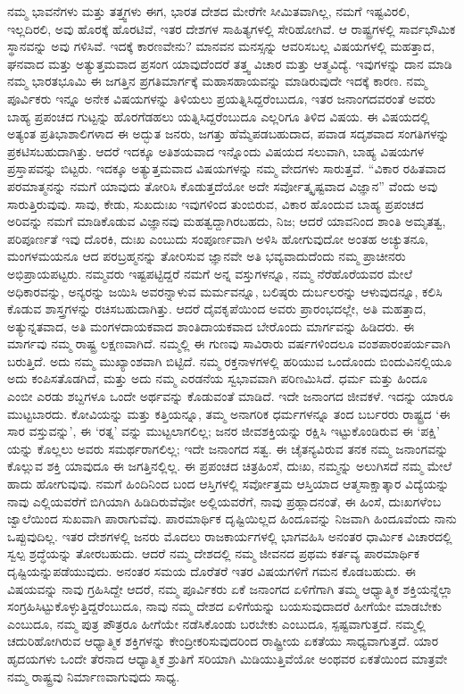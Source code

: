 ನಮ್ಮ ಭಾವನೆಗಳು ಮತ್ತು ತತ್ತ್ವಗಳು ಈಗ, ಭಾರತ ದೇಶದ ಮೇರೆಗೇ ಸೀಮಿತವಾಗಿಲ್ಲ, ನಮಗೆ ಇಷ್ಟವಿರಲಿ, ಇಲ್ಲದಿರಲಿ, ಅವು ಹೊರಕ್ಕೆ ಹೊರಟಿವೆ, ಇತರ ದೇಶಗಳ ಸಾಹಿತ್ಯಗಳಲ್ಲಿ ಸೇರಿಹೋಗಿವೆ. ಆ ರಾಷ್ಟ್ರಗಳಲ್ಲಿ ಸಾರ್ವಭೌಮಿಕ ಸ್ಥಾನವನ್ನು ಅವು ಗಳಿಸಿವೆ. ಇದಕ್ಕೆ ಕಾರಣವೇನು? ಮಾನವನ ಮನಸ್ಸನ್ನು ಆವರಿಸಬಲ್ಲ ವಿಷಯಗಳಲ್ಲಿ ಮಹತ್ತಾದ, ಘನವಾದ ಮತ್ತು ಅತ್ಯುತ್ತಮವಾದ ಪ್ರಸಂಗ ಯಾವುದೆಂದರೆ ತತ್ತ್ವ ವಿಚಾರ ಮತ್ತು ಆತ್ಮವಿದ್ಯೆ. ಇವುಗಳನ್ನು ದಾನ ಮಾಡಿ ನಮ್ಮ ಭಾರತಭೂಮಿ ಈ ಜಗತ್ತಿನ ಪ್ರಗತಿಮಾರ್ಗಕ್ಕೆ ಮಹಾಸಹಾಯವನ್ನು ಮಾಡಿರುವುದೇ ಇದಕ್ಕೆ ಕಾರಣ. ನಮ್ಮ ಪೂರ್ವಿಕರು ಇನ್ನೂ ಅನೇಕ ವಿಷಯಗಳನ್ನು ತಿಳಿಯಲು ಪ್ರಯತ್ನಿಸಿದ್ದರೆಂಬುದೂ, ಇತರ ಜನಾಂಗದವರಂತೆ ಅವರು ಬಾಹ್ಯ ಪ್ರಪಂಚದ ಗುಟ್ಟನ್ನು ಹೊರಗೆಡಹಲು ಯತ್ನಿಸಿದ್ದರೆಂಬುದೂ ಎಲ್ಲರಿಗೂ ತಿಳಿದ ವಿಷಯ. ಈ ವಿಷಯದಲ್ಲಿ ಅತ್ಯಂತ ಪ್ರತಿಭಾಶಾಲಿಗಳಾದ ಈ ಅದ್ಭುತ ಜನರು, ಜಗತ್ತು ಹೆಮ್ಮೆಪಡಬಹುದಾದ, ಪವಾಡ ಸದೃಶವಾದ ಸಂಗತಿಗಳನ್ನು ಪ್ರಕಟಿಸಬಹುದಾಗಿತ್ತು. ಆದರೆ ಇದಕ್ಕೂ ಅತಿಶಯವಾದ ಇನ್ನೊಂದು ವಿಷಯದ ಸಲುವಾಗಿ, ಬಾಹ್ಯ ವಿಷಯಗಳ ಪ್ರಸ್ತಾಪವನ್ನು ಬಿಟ್ಟರು. ಇದಕ್ಕೂ ಅತ್ಯುತ್ತಮವಾದ ವಿಷಯಗಳನ್ನು ನಮ್ಮ ವೇದಗಳು ಸಾರುತ್ತವೆ. “ವಿಕಾರ ರಹಿತವಾದ ಪರಮಾತ್ಮನನ್ನು ನಮಗೆ ಯಾವುದು ತೋರಿಸಿ ಕೊಡುತ್ತದೆಯೋ ಅದೇ ಸರ್ವೋತ್ಕೃಷ್ಟವಾದ ವಿಜ್ಞಾನ” ವೆಂದು ಅವು ಸಾರುತ್ತಿರುವುವು. ಸಾವು, ಕೇಡು, ಸುಖದುಃಖ ಇವುಗಳಿಂದ ತುಂಬಿರುವ, ವಿಕಾರ ಹೊಂದುವ ಬಾಹ್ಯ ಪ್ರಪಂಚದ ಅರಿವನ್ನು ನಮಗೆ ಮಾಡಿಕೊಡುವ ವಿಜ್ಞಾನವು ಮಹತ್ವದ್ದಾಗಿರಬಹದು, ನಿಜ; ಆದರೆ ಯಾವನಿಂದ ಶಾಂತಿ ಅಮೃತತ್ವ, ಪರಿಪೂರ್ಣತೆ ಇವು ದೊರಕಿ, ದುಃಖ ಎಂಬುದು ಸಂಪೂರ್ಣವಾಗಿ ಅಳಿಸಿ ಹೋಗುವುದೋ ಅಂತಹ ಅಚ್ಯುತನೂ, ಮಂಗಳಮಯನೂ ಆದ ಪರಬ್ರಹ್ಮನನ್ನು ತೋರಿಸುವ ಜ್ಞಾನವೇ ಅತಿ ಭವ್ಯವಾದುದೆಂದು ನಮ್ಮ ಪ್ರಾಚೀನರು ಅಭಿಪ್ರಾಯಪಟ್ಟರು. ನಮ್ಮವರು ಇಷ್ಟಪಟ್ಟಿದ್ದರೆ ನಮಗೆ ಅನ್ನ ವಸ್ತುಗಳನ್ನೂ, ನಮ್ಮ ನೆರೆಹೊರೆಯವರ ಮೇಲೆ ಅಧಿಕಾರವನ್ನು, ಅನ್ಯರನ್ನು ಜಯಿಸಿ ಅವರನ್ನಾಳುವ ಮರ್ಮವನ್ನೂ, ಬಲಿಷ್ಠರು ದುರ್ಬಲರನ್ನು ಆಳುವುದನ್ನೂ, ಕಲಿಸಿ ಕೊಡುವ ಶಾಸ್ತ್ರಗಳನ್ನು ರಚಿಸಬಹುದಾಗಿತ್ತು. ಆದರೆ ದೈವಕೃಪೆಯಿಂದ ಅವರು ಪ್ರಾರಂಭದಲ್ಲೇ, ಅತಿ ಮಹತ್ತಾದ, ಅತ್ಯುನ್ನತವಾದ, ಅತಿ ಮಂಗಳದಾಯಕವಾದ ಶಾಂತಿದಾಯಕವಾದ ಬೇರೊಂದು ಮಾರ್ಗವನ್ನು ಹಿಡಿದರು. ಈ ಮಾರ್ಗವು ನಮ್ಮ ರಾಷ್ಟ್ರ ಲಕ್ಷಣವಾಗಿದೆ. ನಮ್ಮಲ್ಲಿ ಈ ಗುಣವು ಸಾವಿರಾರು ವರ್ಷಗಳಿಂದಲೂ ವಂಶಪಾರಂಪರ್ಯವಾಗಿ ಬರುತ್ತಿದೆ. ಅದು ನಮ್ಮ ಮುಖ್ಯಾಂಶವಾಗಿ ಬಿಟ್ಟಿದೆ. ನಮ್ಮ ರಕ್ತನಾಳಗಳಲ್ಲಿ ಹರಿಯುವ ಒಂದೊಂದು ಬಿಂದುವಿನಲ್ಲಿಯೂ ಅದು ಕಂಪಿಸತೊಡಗಿದೆ, ಮತ್ತು ಅದು ನಮ್ಮ ಎರಡನೆಯ ಸ್ವಭಾವವಾಗಿ ಪರಿಣಮಿಸಿದೆ. ಧರ್ಮ ಮತ್ತು ಹಿಂದೂ ಎಂಬೀ ಎರಡು ಶಬ್ದಗಳೂ ಒಂದೇ ಅರ್ಥವನ್ನು ಕೊಡುವಂತೆ ಮಾಡಿದೆ. ಇದೇ ಜನಾಂಗದ ಜೀವಕಳೆ. ಇದನ್ನು ಯಾರೂ ಮುಟ್ಟಬಾರದು. ಕೋವಿಯನ್ನು ಮತ್ತು ಕತ್ತಿಯನ್ನೂ, ತಮ್ಮ ಅನಾಗರಿಕ ಧರ್ಮಗಳನ್ನೂ ತಂದ ಬರ್ಬರರು ರಾಷ್ಟ್ರದ ‘ಈ ಸಾರ ವಸ್ತುವನ್ನು’, ಈ ‘ರತ್ನ’ ವನ್ನು ಮುಟ್ಟಲಾಗಲಿಲ್ಲ; ಜನರ ಜೀವಶಕ್ತಿಯನ್ನು ರಕ್ಷಿಸಿ ಇಟ್ಟುಕೊಂಡಿರುವ ಈ ‘ಪಕ್ಷಿ’ ಯನ್ನು ಕೊಲ್ಲಲು ಅವರು ಸಮರ್ಥರಾಗಲಿಲ್ಲ; ಇದೇ ಜನಾಂಗದ ಸತ್ವ. ಈ ಚೈತನ್ಯವಿರುವ ತನಕ ನಮ್ಮ ಜನಾಂಗವನ್ನು ಕೊಲ್ಲುವ ಶಕ್ತಿ ಯಾವುದೂ ಈ ಜಗತ್ತಿನಲ್ಲಿಲ್ಲ. ಈ ಪ್ರಪಂಚದ ಚಿತ್ರಹಿಂಸೆ, ದುಃಖ, ನಮ್ಮನ್ನು ಅಲುಗಿಸದೆ ನಮ್ಮ ಮೇಲೆ ಹಾದು ಹೋಗುವುವು. ನಮಗೆ ಹಿಂದಿನಿಂದ ಬಂದ ಆಸ್ತಿಗಳಲ್ಲಿ ಸರ್ವೋತ್ತಮ ಆಸ್ತಿಯಾದ ಆತ್ಮಸಾಕ್ಷಾತ್ಕಾರ ವಿದ್ಯೆಯನ್ನು ನಾವು ಎಲ್ಲಿಯವರೆಗೆ ಬಿಗಿಯಾಗಿ ಹಿಡಿದಿರುವೆವೋ ಅಲ್ಲಿಯವರೆಗೆ, ನಾವು ಪ್ರಹ್ಲಾದನಂತೆ, ಈ ಹಿಂಸೆ, ದುಃಖಗಳೆಂಬ ಜ್ವಾಲೆಯಿಂದ ಸುಖವಾಗಿ ಪಾರಾಗುವೆವು. ಪಾರಮಾರ್ಥಿಕ ದೃಷ್ಟಿಯಿಲ್ಲದ ಹಿಂದೂವನ್ನು ನಿಜವಾಗಿ ಹಿಂದೂವೆಂದು ನಾನು ಒಪ್ಪುವುದಿಲ್ಲ. ಇತರ ದೇಶಗಳಲ್ಲಿ ಜನರು ಮೊದಲು ರಾಜಕಾರ್ಯಗಳಲ್ಲಿ ಭಾಗವಹಿಸಿ ಅನಂತರ ಧಾರ್ಮಿಕ ವಿಚಾರದಲ್ಲಿ ಸ್ವಲ್ಪ ಶ್ರದ್ಧೆಯನ್ನು ತೋರಬಹುದು. ಆದರೆ ನಮ್ಮ ದೇಶದಲ್ಲಿ ನಮ್ಮ ಜೀವನದ ಪ್ರಥಮ ಕರ್ತವ್ಯ ಪಾರಮಾರ್ಥಿಕ ದೃಷ್ಟಿಯನ್ನು\break ಪಡೆಯುವುದು. ಅನಂತರ ಸಮಯ ದೊರೆತರೆ ಇತರ ವಿಷಯಗಳಿಗೆ ಗಮನ ಕೊಡಬಹುದು. ಈ ವಿಷಯವನ್ನು ನಾವು ಗ್ರಹಿಸಿದ್ದೇ ಆದರೆ, ನಮ್ಮ ಪೂರ್ವಿಕರು ಏಕೆ ಜನಾಂಗದ ಏಳಿಗೆಗಾಗಿ ತಮ್ಮ ಆಧ್ಯಾತ್ಮಿಕ ಶಕ್ತಿಯನ್ನೆಲ್ಲಾ ಸಂಗ್ರಹಿಸಿಟ್ಟುಕೊಳ್ಳುತ್ತಿದ್ದರೆಂಬುದೂ, ನಾವು ನಮ್ಮ ದೇಶದ ಏಳಿಗೆಯನ್ನು ಬಯಸುವುದಾದರೆ ಹೀಗೆಯೇ ಮಾಡಬೇಕು ಎಂಬುದೂ, ನಮ್ಮ ಪುತ್ರ ಪೌತ್ರರೂ ಹೀಗೆಯೇ ನಡೆಸಿಕೊಂಡು ಬರಬೇಕು ಎಂಬುದೂ, ಸ್ಪಷ್ಟವಾಗುತ್ತದೆ. ನಮ್ಮಲ್ಲಿ ಚದುರಿಹೋಗಿರುವ ಆಧ್ಯಾತ್ಮಿಕ ಶಕ್ತಿಗಳನ್ನು ಕೇಂದ್ರೀಕರಿಸುವುದರಿಂದ ರಾಷ್ಟ್ರೀಯ ಏಕತೆಯು ಸಾಧ್ಯವಾಗುತ್ತದೆ. ಯಾರ ಹೃದಯಗಳು ಒಂದೇ ತೆರನಾದ ಆಧ್ಯಾತ್ಮಿಕ ಶ್ರುತಿಗೆ ಸರಿಯಾಗಿ ಮಿಡಿಯುತ್ತಿವೆಯೋ ಅಂಥವರ ಏಕತೆಯಿಂದ ಮಾತ್ರವೇ ನಮ್ಮ ರಾಷ್ಟ್ರವು ನಿರ್ಮಾಣವಾಗುವುದು ಸಾಧ್ಯ.

